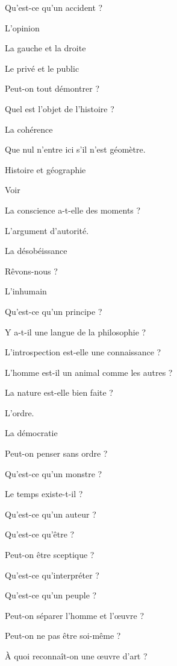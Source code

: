 \documentclass[a4paper,12pt]{report}
\begin{document}
\begin{multicols}{2}
\noindent Qu'est-ce qu'un accident ? \par
\noindent L'opinion \par
\noindent La gauche et la droite \par
\noindent Le privé et le public \par
\noindent Peut-on tout démontrer ? \par
\noindent Quel est l'objet de l'histoire ? \par
\noindent La cohérence \par
\noindent Que nul n'entre ici s'il n'est géomètre. \par
\noindent Histoire et géographie \par
\noindent Voir \par
\noindent La conscience a-t-elle des moments ? \par
\noindent L'argument d'autorité. \par
\noindent La désobéissance \par
\noindent Rêvons-nous ? \par
\noindent L'inhumain \par
\noindent Qu'est-ce qu'un principe ? \par
\noindent Y a-t-il une langue de la philosophie ? \par
\noindent L'introspection est-elle une connaissance ? \par
\noindent L'homme est-il un animal comme les autres ? \par
\noindent La nature est-elle bien faite ? \par
\noindent L'ordre. \par
\noindent La démocratie \par
\noindent Peut-on penser sans ordre ? \par
\noindent Qu'est-ce qu'un monstre ? \par
\noindent Le temps existe-t-il ? \par
\noindent Qu'est-ce qu'un auteur ? \par
\noindent Qu'est-ce qu'être ? \par
\noindent Peut-on être sceptique ? \par
\noindent Qu'est-ce qu'interpréter ? \par
\noindent Qu'est-ce qu'un peuple ? \par
\noindent Peut-on séparer l'homme et l'œuvre ? \par
\noindent Peut-on ne pas être soi-même ? \par
\noindent À quoi reconnaît-on une œuvre d'art ? \par

\end{multicols}
\end{document}
